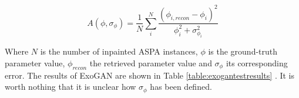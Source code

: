 \begin{equation}
    A(\phi ,\sigma_\phi) = \frac{1}{N} \sum_{i}^{N} \frac{(\phi_{i,recon}-\phi_i)^2}{\phi_i^2+\sigma_{\phi_i}^2}
\end{equation}

Where $N$ is the number of inpainted ASPA instances, $\phi$ is the ground-truth parameter value, $\phi_{recon}$ the retrieved parameter value and $\sigma_\phi$ its corresponding error. The results of ExoGAN are shown in Table \ref{table:exogantestresults} . It is worth nothing that it is unclear how $\sigma_{\phi}$ has been defined.



















